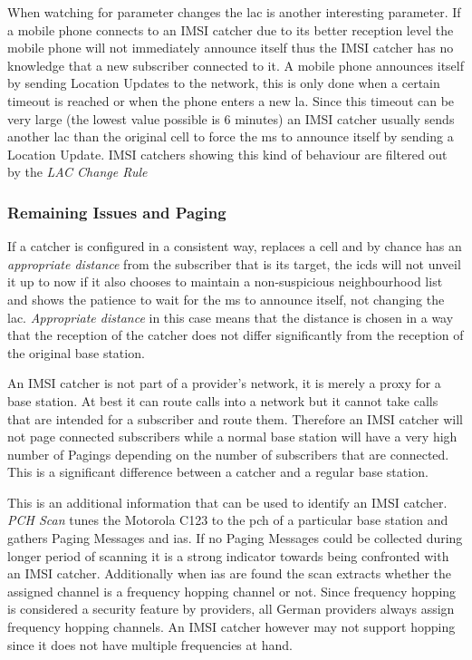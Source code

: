 When watching for parameter changes the \gls{lac} is another interesting parameter.
If a mobile phone connects to an IMSI catcher due to its better reception level the mobile phone will not immediately announce itself thus the IMSI catcher has no knowledge that a new subscriber connected to it.
A mobile phone announces itself by sending Location Updates to the network, this is only done when a certain timeout is reached or when the phone enters a new \gls{la}.
Since this timeout can be very large (the lowest value possible is 6 minutes) an IMSI catcher usually sends another \gls{lac} than the original cell to force the \gls{ms} to announce itself by sending a Location Update.
IMSI catchers showing this kind of behaviour are filtered out by the \emph{LAC Change Rule}

\subsubsection{Remaining Issues and Paging}
\label{sec:paging}
If a catcher is configured in a consistent way, replaces a cell and by chance has an \emph{appropriate distance} from the subscriber that is its target, the \gls{icds} will not unveil it up to now if it also chooses to maintain a non-suspicious neighbourhood list and shows the patience to wait for the \gls{ms} to announce itself, \eg not changing the \gls{lac}.
\emph{Appropriate distance} in this case means that the distance is chosen in a way that the reception of the catcher does not differ significantly from the reception of the original base station.

An IMSI catcher is not part of a provider's network, it is merely a proxy for a base station.
At best it can route calls into a network but it cannot take calls that are intended for a subscriber and route them.
Therefore an IMSI catcher will not page connected subscribers while a normal base station will have a very high number of Pagings depending on the number of subscribers that are connected.
This is a significant difference between a catcher and a regular base station.

This is an additional information that can be used to identify an IMSI catcher.
\emph{PCH Scan} tunes the Motorola C123 to the \gls{pch} of a particular base station and gathers Paging Messages and \glspl{ia}.
If no Paging Messages could be collected during longer period of scanning it is a strong indicator towards being confronted with an IMSI catcher.
Additionally when \glspl{ia} are found the scan extracts whether the assigned channel is a frequency hopping channel or not.
Since frequency hopping is considered a security feature by providers, all German providers always assign frequency hopping channels.
An IMSI catcher however may not support hopping since it does not have multiple frequencies at hand.

